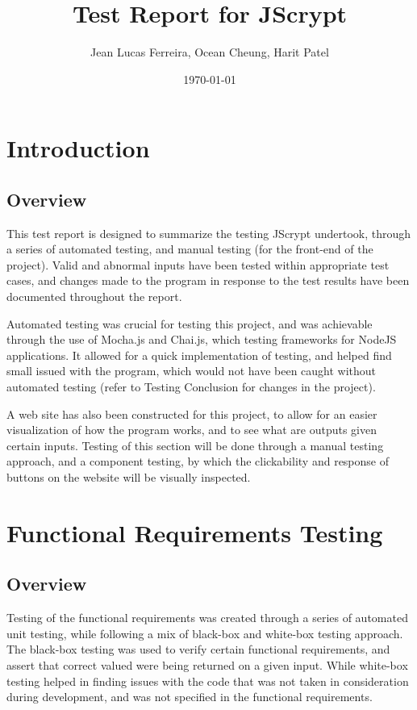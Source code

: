\documentclass[12pt]{article}
\begin{document}
\title{Test Report for JScrypt}
\author{Jean Lucas Ferreira, Ocean Cheung, Harit Patel}

\date{\today}

\maketitle


\newpage
  \tableofcontents

\newpage

\section{Introduction}

\subsection{Overview}
This test report is designed to summarize the testing JScrypt undertook, through a series of automated testing, and manual testing (for the front-end of the project). Valid and abnormal inputs have been tested within appropriate test cases, and changes made to the program in response to the test results have been documented throughout the report.

Automated testing was crucial for testing this project, and was achievable through the use of Mocha.js and Chai.js, which testing frameworks for NodeJS applications. It allowed for a quick implementation of testing, and helped find small issued with the program, which would not have been caught without automated testing (refer to Testing Conclusion for changes in the project).

A web site has also been constructed for this project, to allow for an easier visualization of how the program works, and to see what are outputs given certain inputs. Testing of this section will be done through a manual testing approach, and a component testing, by which the clickability and response of buttons on the website will be visually inspected.





\section{Functional Requirements Testing}
\subsection{Overview}
Testing of the functional requirements was created through a series of automated unit testing, while following a mix of black-box and white-box testing approach. The black-box testing was used to verify certain functional requirements, and assert that correct valued were being returned on a given input. While white-box testing helped in finding issues with the code that was not taken in consideration during development, and was not specified in the functional requirements.
\end{document}
